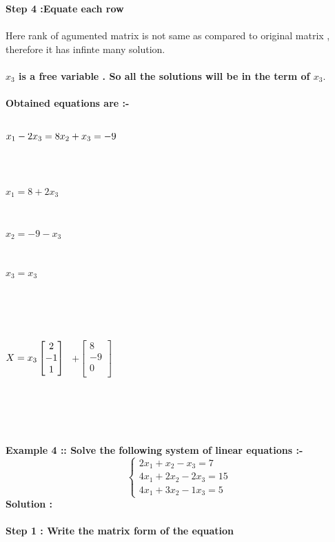 \documentclass[15pt]{article}
\begin{document}
\textbf{Step 4 :Equate each row  }\\
\\
\textbf{}{Here rank of agumented matrix is not same as compared to original matrix , therefore it has infinte many solution.}
\\
\\
\textbf{ $x_3$ is a free variable . So all the solutions will be in the term of $x_3.$}\\
\\
\textbf{Obtained equations are :-}\\
\\
\centerline{$x_1 - 2x_3 = 8 \\ x_2 +x_3 = -9$}
\\
\\
\centerline{$ x_1 = 8 + 2x_3 $}\\
\centerline{$ x_2 = -9 - x_3 $}\\
\centerline{$  x_3 = x_3$}
\\
\\
\\
\centerline{
$\begin{matrix}
X=\space x_3
\begin{bmatrix}
 2\\
-1\\
 1\\
\end{bmatrix}
\end{matrix}$
$\begin{matrix}
+
\begin{bmatrix}
 8\\
-9\\
 0\\
\end{bmatrix}
\end{matrix}$}
\\
\\
\\
\\
\textbf{Example 4 :: Solve the following system of linear equations :- }
\[
\left\{ 
\begin{array}{c}
2x_1+x_2-x_3=7 \\ 
4x_1+2x_2-2x_3=15\\ 
4x_1+3x_2-1x_3=5
\end{array}
\right. 
\]
\textbf{Solution :}\\
\\
\hspace{1.5cm}
\textbf{Step 1 : Write the matrix form of the equation }\\
\end{document}
